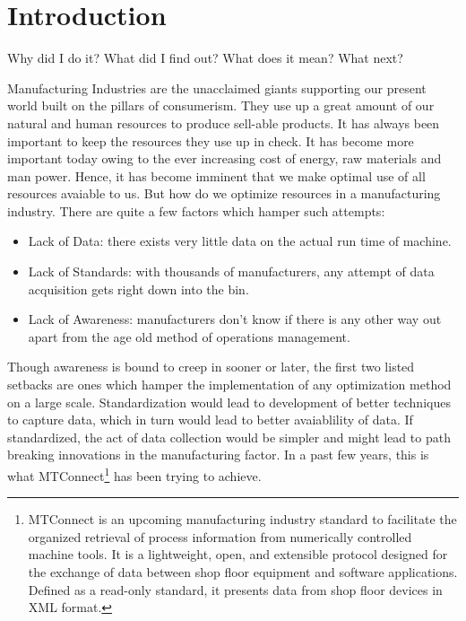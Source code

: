 \documentclass[preprint,authoryear,5p,times,twocolumn]{elsarticle}
\begin{document}

\section{Introduction}
\label{Introduction}
Why did I do it?
What did I find out?
What does it mean?
What next?

Manufacturing Industries are the unacclaimed giants supporting our present world built on the pillars of consumerism. They use up a great amount of our natural and human resources to produce sell-able products. It has  always been important to keep the resources they use up in check. It has become more important today owing to the ever increasing cost of energy, raw materials and man power. Hence, it has become imminent that we make optimal use of all resources avaiable to us. But how do we optimize resources in a manufacturing industry. There are quite a few factors which hamper such attempts:
\begin{itemize}
\item Lack of Data: there exists very little data on the actual run time of machine.
\item Lack of Standards: with thousands of manufacturers, any attempt of data acquisition gets right down into the bin.
\item Lack of Awareness: manufacturers don’t know if there is any other way out apart from the age old method of operations management.
\end{itemize}
Though awareness is bound to creep in sooner or later, the first two listed setbacks are ones which hamper the implementation of any optimization method on a large scale. Standardization would lead to development of better techniques to capture data, which in turn would lead to better avaiablility of data. If standardized, the act of data collection would be simpler and might lead to path breaking innovations in the manufacturing factor. In a past few years, this is what MTConnect\footnote{MTConnect is an upcoming manufacturing industry standard to facilitate the organized retrieval of process information from numerically controlled machine tools. It is a lightweight, open, and extensible protocol designed for the exchange of data between shop floor equipment and software applications. Defined as a read-only standard, it presents data from shop floor devices in XML format.} has been trying to achieve.
\end{document}

